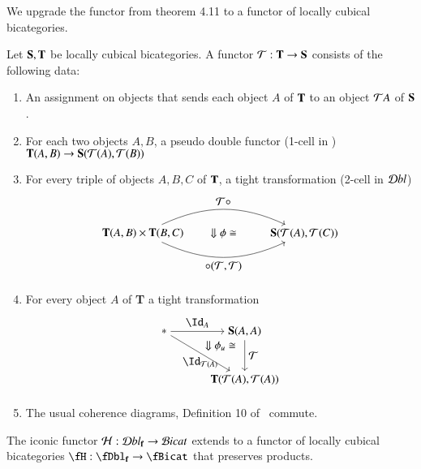 We upgrade the functor from theorem 4.11 to a functor of locally cubical bicategories.


\begin{defn}\label{def:lcbcfunc}
Let ${\bf S,T}$ be locally cubical bicategories. A functor $\mathcal{T}: {\bf T} \rightarrow {\bf S}$ consists of the following data:
\begin{enumerate}
\item An assignment on objects that sends each object $A$ of ${\bf T}$ to an object $\mathcal{T} A$ of ${\bf S}$.
\item For each two objects $A,B$, a pseudo double functor (1-cell in \cDbl) ${\bf T}(A,B) \rightarrow {\bf S}(\mathcal{T}(A),\mathcal{T}(B))$
\item For every triple of objects $A,B,C$ of ${\bf T}$, a tight transformation (2-cell in $\mathcal{D} bl$) 
\begin{align} 
\begin{tikzpicture}
\node(1) at (0,0) {${\bf T}(A,B) \times {\bf T}(B,C)$};
\node(2) at (5,0) {${\bf S}(\cT(A),\cT(C))$};
\draw[->] (1) to[in=155, out=25] node[above]{$\cT \comp $} (2); 
\draw[->] (1) to[in=-155, out=-25] node[below]{$ \comp (\cT,\cT)$} (2); 
\node at (2.5,0) {$\Downarrow \phi \iso$};
\end{tikzpicture}
\end{align}
\item For every object $A$ of {\bf T} a tight transformation
\begin{align}
\begin{tikzpicture}[xscale=.5, yscale=.3]
\node(1) at (0,0) {$*$};
\node(2) at (5,0) {${\bf S}(A,A)$};
\node(3) at (5,-5) {${\bf T}(\cT(A),\cT(A))$};
\draw[->] (1) to node[above]{$\looseid_{A}$} (2); 
\draw[->] (1) to node[below]{$\looseid_{\cT(A)}$} (3);
\draw[->] (2) to node[right]{$\cT$} (3); 
\node at (3.5,-1.5) {$\Downarrow \phi_u \iso$};
\end{tikzpicture}
\end{align}
\item The usual coherence diagrams, Definition 10 of~\cite{nick:tricatsbook} commute.
\end{enumerate}
\end{defn}



\begin{prop}
The iconic functor $\mathcal{H}: \mathcal{D} bl_{\bf f} \rightarrow \mathcal{B} icat$ extends to a functor of locally cubical bicategories $\fH: \fDbl_{\bf f} \rightarrow \fBicat$ that preserves products.
\end{prop}

